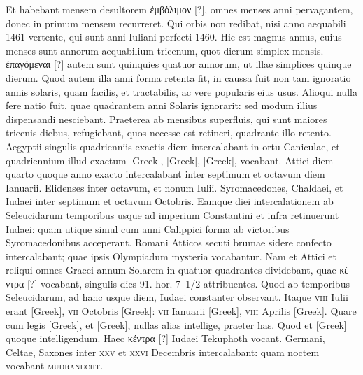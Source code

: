 Et habebant mensem desultorem
\textgreek{ἐμβὀλιμον [?]}, omnes menses anni pervagantem, donec in primum
mensem recurreret.
Qui orbis non redibat, nisi anno aequabili 1461
vertente, qui sunt anni Iuliani perfecti 1460.
Hic est magnus annus,
cuius menses sunt annorum aequabilium tricenum, quot dierum simplex
mensis.
\textgreek{ἐπαγόμεναι [?]} autem sunt quinquies quatuor annorum, ut
illae simplices quinque dierum.
Quod autem illa anni forma retenta
fit, in caussa fuit non tam ignoratio annis solaris,
 quam facilis, et tractabilis,
ac vere popularis eius usus.
Alioqui nulla fere natio fuit, quae
quadrantem anni Solaris ignorarit: sed modum illius dispensandi
nesciebant.
Praeterea ab mensibus superfluis, qui sunt maiores tricenis
diebus, refugiebant, quos necesse est retincri,
 quadrante illo retento.
Aegyptii singulis quadrienniis exactis diem intercalabant
 in ortu Caniculae,
et quadriennium illud exactum \textgreek{[Greek]}, \textgreek{[Greek]},
\textgreek{[Greek]}, vocabant.
Attici diem quarto quoque anno exacto intercalabant
inter septimum et octavum diem Ianuarii.
Elidenses inter
octavum, et nonum Iulii.
Syromacedones, Chaldaei, et Iudaei inter
septimum et octavum Octobris.
Eamque diei intercalationem ab Seleucidarum
temporibus usque ad imperium Constantini et infra retinuerunt
Iudaei: quam utique simul cum anni Calippici forma ab victoribus
Syromacedonibus acceperant.
Romani Atticos secuti brumae
sidere confecto intercalabant; quae ipsis Olympiadum mysteria vocabantur.
Nam et Attici et reliqui omnes Graeci annum Solarem in
quatuor quadrantes dividebant, quae \textgreek{κέντρα [?]}
 vocabant, singulis dies 91.
hor. 7~1/2 attribuentes.
Quod ab temporibus Seleucidarum, ad hanc usque
diem, Iudaei constanter observant.
Itaque \textsc{viii} Iulii erant \textgreek{[Greek]},
\textsc{vii} Octobris \textgreek{[Greek]}:
 \textsc{vii} Ianuarii \textgreek{[Greek]}, \textsc{viii}
Aprilis \textgreek{[Greek]}.
Quare cum legis \textgreek{[Greek]}, et \textgreek{[Greek]},
nullas alias intellige, praeter has.
Quod et \textgreek{[Greek]} quoque intelligendum.
Haec \textgreek{κέντρα [?]} Iudaei Tekuphoth vocant.
Germani, Celtae,
Saxones inter \textsc{xxv} et \textsc{xxvi} Decembris intercalabant:
 quam noctem
vocabant \textsc{mudranecht}.
